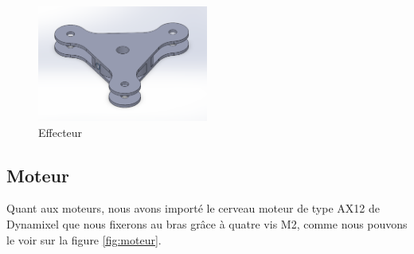 \documentclass[a4paper, 11pt]{report}
\begin{document}
\begin{figure}[h]
    \centering
    \includegraphics[width=0.5\textwidth]{Figures/effecteur.png}
    \caption{Effecteur}
    \label{fig:effecteur}
\end{figure}

\subsection{Moteur}

Quant aux moteurs, nous avons importé le cerveau moteur de type AX12 de Dynamixel que nous fixerons au bras grâce à quatre vis M2, 
comme nous pouvons le voir sur la figure \ref{fig:moteur}.
\end{document}
